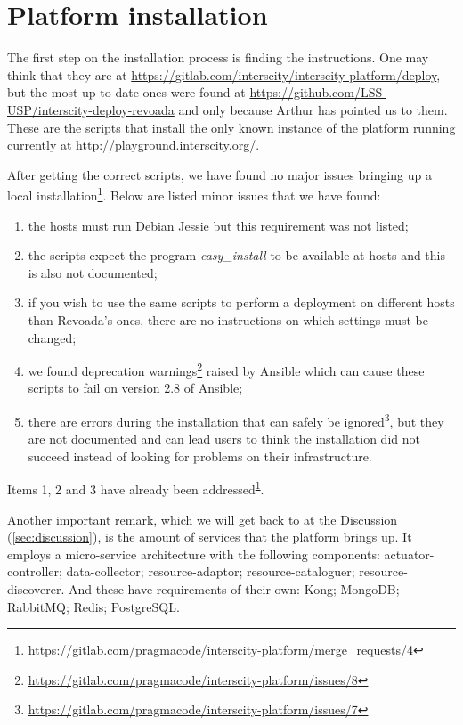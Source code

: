 \documentclass[paper=a4, fontsize=11pt]{scrartcl}
\numberwithin{equation}{section}    %
\numberwithin{figure}{section}      %
\numberwithin{table}{section}        %
\begin{document}
\section{Platform installation}
  The first step on the installation process is finding the instructions. One may think that they are at \url{https://gitlab.com/interscity/interscity-platform/deploy}, but the most up to date ones were found at \url{https://github.com/LSS-USP/interscity-deploy-revoada} and only because Arthur has pointed us to them. These are the scripts that install the only known instance of the platform running currently at \url{http://playground.interscity.org/}.

  After getting the correct scripts, we have found no major issues bringing up a local installation\footnote{\label{installation-mr}\url{https://gitlab.com/pragmacode/interscity-platform/merge_requests/4}}. Below are listed minor issues that we have found:

  \begin{enumerate}
    \item the hosts must run Debian Jessie but this requirement was not listed;
    \item the scripts expect the program \textit{easy\_install} to be available at hosts and this is also not documented;
    \item if you wish to use the same scripts to perform a deployment on different hosts than Revoada's ones, there are no instructions on which settings must be changed;
    \item we found deprecation warnings\footnote{\url{https://gitlab.com/pragmacode/interscity-platform/issues/8}} raised by Ansible which can cause these scripts to fail on version 2.8 of Ansible;
    \item there are errors during the installation that can safely be ignored\footnote{\url{https://gitlab.com/pragmacode/interscity-platform/issues/7}}, but they are not documented and can lead users to think the installation did not succeed instead of looking for problems on their infrastructure.
  \end{enumerate}

  Items 1, 2 and 3 have already been addressed\textsuperscript{\ref{installation-mr}}.

  Another important remark, which we will get back to at the Discussion (\ref{sec:discussion}), is the amount of services that the platform brings up. It employs a micro-service architecture with the following components: actuator-controller; data-collector; resource-adaptor; resource-cataloguer; resource-discoverer. And these have requirements of their own: Kong; MongoDB; RabbitMQ; Redis; PostgreSQL.
\end{document}
